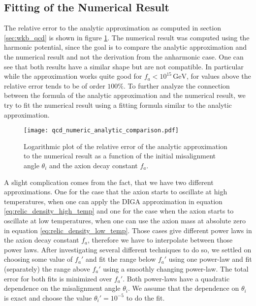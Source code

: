 \documentclass[twoside,a4paper, 12pt]{article}
\numberwithin{equation}{section}
\begin{document}
\subsection{Fitting of the Numerical Result}
\label{sec:fitting}
The relative error to the analytic approximation
as computed in section \ref{sec:wkb_qcd} is shown in figure \ref{fig:analytic_numerical_comparison}.
The numerical result was computed using the harmonic
potential, since the goal is to compare the analytic approximation and the numerical result and not the derivation from
the anharmonic case. One can see that both results have a similar shape but are not compatible.
In particular while the approximation works quite good for $f_a < 10^{15} \, \mathrm{GeV}$, for values above the relative error tends to be of order $100\%$.
\noindent
To further analyze the connection between the formula of the analytic approximation and the numerical result,
we try to fit the numerical result using a fitting formula similar to the analytic approximation.
\begin{figure}[H]
    \centering
    \texttt{[image: qcd\_numeric\_analytic\_comparison.pdf]}
    \caption{Logarithmic plot of the relative error of the analytic approximation to the numerical result as a function of the initial misalignment angle $\theta_i$ and the axion decay constant $f_a$.
    }
    \label{fig:analytic_numerical_comparison}
\end{figure}
A slight complication comes from the fact, that we have two different approximations.
One for the case that the axion starts to oscillate at high temperatures, when one can apply the DIGA approximation in equation \eqref{eq:relic_density_high_temp}
and one for the case when the axion starts to oscillate at low temperatures, when one can use the
axion mass at absolute zero in equation \eqref{eq:relic_density_low_temp}.
Those cases give different power laws in the axion decay constant $f_a$, therefore we have to interpolate between
those power laws. After investigating several different techniques to do so, we settled on
choosing some value of $f_a'$ and fit the range below $f_a'$ using one power-law and
fit (separately) the range above $f_a'$ using a smoothly changing power-law.
The total error for both fits is minimized over $f_a'$.
Both power-laws have a quadratic dependence on the misalignment angle $\theta_i$.
We assume that the dependence on $\theta_i$ is exact and choose the value $\theta_i' = 10^{-5}$ to do the fit.
\end{document}
